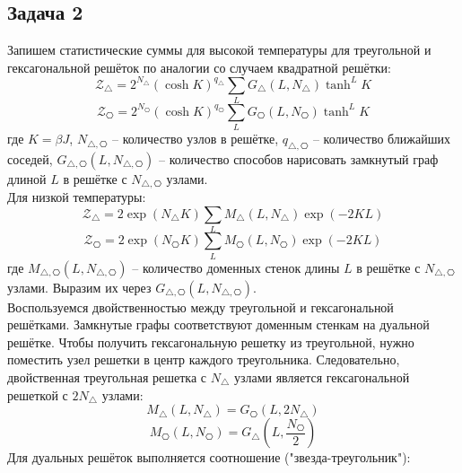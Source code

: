 \documentclass[12pt]{article}
\begin{document}
\subsection{Задача 2}
Запишем статистические суммы для высокой температуры для треугольной и гексагональной решёток по аналогии со случаем квадратной решётки:
\begin{equation}
    \mathcal{Z}_\triangle=2^{N_\triangle}(\cosh K)^{q_\triangle}\sum\limits_LG_\triangle(L,N_\triangle)\tanh^L K
\end{equation}
\begin{equation}
    \mathcal{Z}_{\hexagon}=2^{N_{\hexagon}}(\cosh K)^{q_{\hexagon}}\sum\limits_LG_{\hexagon}(L,N_{\hexagon})\tanh^L K
\end{equation}
где $K=\beta J$, $N_{\triangle,\hexagon}$ -- количество узлов в решётке, $q_{\triangle,\hexagon}$ -- количество ближайших соседей, $G_{\triangle,\hexagon}(L,N_{\triangle,\hexagon})$ -- количество способов нарисовать замкнутый граф длиной $L$ в решётке с $N_{\triangle,\hexagon}$ узлами.\\
Для низкой температуры:
\begin{equation}
    \mathcal{Z}_\triangle=2\exp(N_\triangle K)\sum\limits_LM_\triangle(L,N_\triangle)\exp(-2KL)
\end{equation}
\begin{equation}
    \mathcal{Z}_{\hexagon}=2\exp(N_{\hexagon} K)\sum\limits_LM_{\hexagon}(L,N_{\hexagon})\exp(-2KL)
\end{equation}
где $M_{\triangle,\hexagon}(L,N_{\triangle,\hexagon})$ -- количество доменных стенок длины $L$ в решётке с $N_{\triangle,\hexagon}$ узлами. Выразим их через $G_{\triangle,\hexagon}(L,N_{\triangle,\hexagon})$.\\
Воспользуемся двойственностью между треугольной и гексагональной решётками. Замкнутые графы соответствуют доменным стенкам на дуальной решётке. Чтобы получить гексагональную решетку из треугольной, нужно поместить узел решетки в центр каждого треугольника. Следовательно, двойственная треугольная решетка с $N_\triangle$ узлами является гексагональной решеткой с $2N_\triangle$ узлами:
\begin{equation}
    M_\triangle(L,N_\triangle)=G_{\hexagon}(L,2N_\triangle)
\end{equation}
\begin{equation}
    M_{\hexagon}(L,N_{\hexagon})=G_\triangle\left(L,\frac{N_{\hexagon}}{2}\right)
\end{equation}
Для дуальных решёток выполняется соотношение ("звезда-треугольник"):
\end{document}
